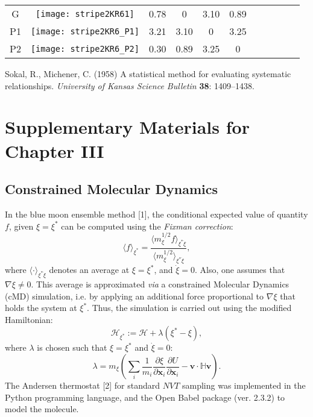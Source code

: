 \documentclass[a4paper,11pt,twoside]{book}%
\begin{document}
\begin{appendices}
\begin{sidewaystable}[h!]
\begin{tabular*}{4cm}{cc|c|c|c|c|c|c|c|c|c|}
\cline{1-6}
\multicolumn{1}{|c|}{G} & \texttt{[image: stripe2KR61]} & 0.78 & 0 & 3.10 & 0.89 & \multirow{4}{*}{} & \multirow{4}{*}{} & \multirow{4}{*}{} & \multirow{4}{*}{} & \multirow{5}{*}{} \\
\cline{1-6}
\multicolumn{1}{|c|}{P1} & \texttt{[image: stripe2KR6\_P1]} & 3.21 & 3.10 & 0 & 3.25 & \multirow{4}{*}{} & \multirow{4}{*}{} & \multirow{4}{*}{} & \multirow{4}{*}{} & \multirow{5}{*}{}  \\
\cline{1-6}
\multicolumn{1}{|c|}{P2} & \texttt{[image: stripe2KR6\_P2]} & 0.30 & 0.89 & 3.25 & 0 & \multirow{4}{*}{} & \multirow{4}{*}{} & \multirow{4}{*}{} & \multirow{4}{*}{} & \multirow{5}{*}{}  \\
\cline{1-11}
\end{tabular*}
\normalfont
\end{sidewaystable}


\begin{thebibliography}{}

 Sokal, R., Michener, C. (1958) A statistical method for evaluating systematic relationships. {\it University of Kansas Science Bulletin} {\bf 38}: 1409--1438.

\end{thebibliography}


\chapter{Supplementary Materials for Chapter III}
\section{Constrained Molecular Dynamics}\label{sec:appendixA}

In the blue moon ensemble method [1], the conditional expected value of quantity $f$, given $\xi=\xi^*$ can be computed using the \emph{Fixman correction}:
\begin{equation}\label{eq:fixman}
 \langle f \rangle_{\xi^*} = \frac{\langle m_\xi^{1/2} f \rangle_{\xi^*\dot{\xi}}}{\langle m_\xi^{1/2} \rangle_{\xi^*\dot{\xi}}},
\end{equation}
where $\langle \cdot \rangle_{\xi^*\dot{\xi}}$ denotes an average at $\xi=\xi^*$, and $\dot{\xi}=0$. 
Also, one assumes that \mbox{$\nabla\xi\neq0$}.
This average is approximated \emph{via} a constrained Molecular Dynamics (cMD) simulation, i.e. by applying an additional force proportional to $\nabla\xi$ that holds the system at $\xi^*$.
Thus, the simulation is carried out using the modified Hamiltonian:
$$
\mathcal{H}_{\xi^*} := \mathcal{H} + \lambda (\xi^* - \xi),
$$
where $\lambda$ is chosen such that $\xi=\xi^*$ and $\dot{\xi}=0$:
$$
\lambda = m_\xi \left( \sum_i \frac{1}{m_i}\frac{\partial\xi}{\partial\mathbf{x}_i}\frac{\partial U}{\partial\mathbf{x}_i} - \mathbf{v}\cdot\mathbb{H}\mathbf{v} \right).
$$
The Andersen thermostat [2] for standard $NVT$ sampling was implemented in the Python programming language, and the Open Babel package (ver. 2.3.2) to model the molecule.


\end{appendices}
\end{document}
